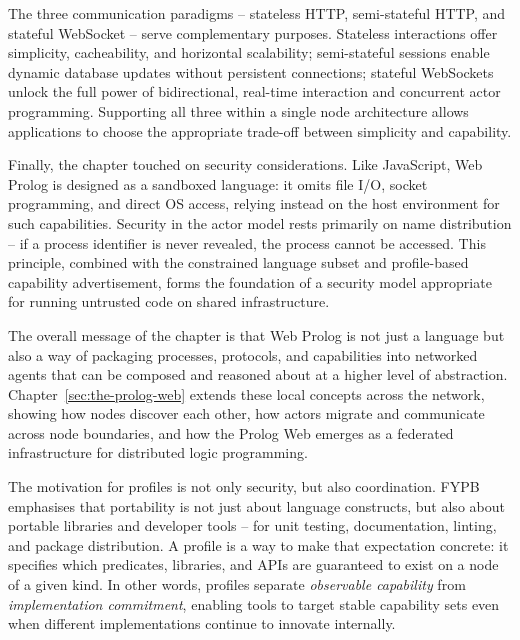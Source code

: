 The three communication paradigms -- stateless HTTP, semi-stateful HTTP, and stateful WebSocket -- serve complementary purposes. Stateless interactions offer simplicity, cacheability, and horizontal scalability; semi-stateful sessions enable dynamic database updates without persistent connections; stateful WebSockets unlock the full power of bidirectional, real-time interaction and concurrent actor programming. Supporting all three within a single node architecture allows applications to choose the appropriate trade-off between simplicity and capability.

Finally, the chapter touched on security considerations. Like JavaScript, Web Prolog is designed as a sandboxed language: it omits file I/O, socket programming, and direct OS access, relying instead on the host environment for such capabilities. Security in the actor model rests primarily on name distribution -- if a process identifier is never revealed, the process cannot be accessed. This principle, combined with the constrained language subset and profile-based capability advertisement, forms the foundation of a security model appropriate for running untrusted code on shared infrastructure.

The overall message of the chapter is that Web Prolog is not just a language but also a way of packaging processes, protocols, and capabilities into networked agents that can be composed and reasoned about at a higher level of abstraction. Chapter~\ref{sec:the-prolog-web} extends these local concepts across the network, showing how nodes discover each other, how actors migrate and communicate across node boundaries, and how the Prolog Web emerges as a federated infrastructure for distributed logic programming.

\medskip
\noindent The motivation for profiles is not only security, but also coordination. FYPB emphasises that portability is not just about language constructs, but also about portable libraries and developer tools -- for unit testing, documentation, linting, and package distribution. A profile is a way to make that expectation concrete: it specifies which predicates, libraries, and APIs are guaranteed to exist on a node of a given kind. In other words, profiles separate \emph{observable capability} from \emph{implementation commitment}, enabling tools to target stable capability sets even when different implementations continue to innovate internally.

